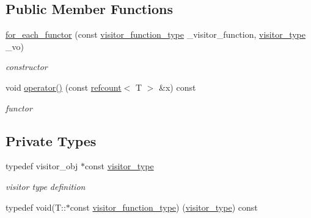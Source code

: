 \subsection*{Public Member Functions}
\begin{DoxyCompactItemize}
\item 
\hyperlink{classfor__each__functor_a3255ca866dbe26aa8f5c9bce0cddd58e}{for\+\_\+each\+\_\+functor} (const \hyperlink{classfor__each__functor_a959ddc30176d0364c4ceb00d09ae996b}{visitor\+\_\+function\+\_\+type} \+\_\+visitor\+\_\+function, \hyperlink{classfor__each__functor_ad8dbe39e38c2b3c71543522a86565122}{visitor\+\_\+type} \+\_\+vo)
\begin{DoxyCompactList}\small\item\em constructor \end{DoxyCompactList}\item 
void \hyperlink{classfor__each__functor_a6e3884dc44022d03e574ceedf93fc266}{operator()} (const \hyperlink{structrefcount}{refcount}$<$ T $>$ \&x) const
\begin{DoxyCompactList}\small\item\em functor \end{DoxyCompactList}\end{DoxyCompactItemize}
\subsection*{Private Types}
\begin{DoxyCompactItemize}
\item 
typedef visitor\+\_\+obj $\ast$const \hyperlink{classfor__each__functor_ad8dbe39e38c2b3c71543522a86565122}{visitor\+\_\+type}
\begin{DoxyCompactList}\small\item\em visitor type definition \end{DoxyCompactList}\item 
typedef void(T\+::$\ast$const \hyperlink{classfor__each__functor_a959ddc30176d0364c4ceb00d09ae996b}{visitor\+\_\+function\+\_\+type}) (\hyperlink{classfor__each__functor_ad8dbe39e38c2b3c71543522a86565122}{visitor\+\_\+type}) const
\end{DoxyCompactItemize}
